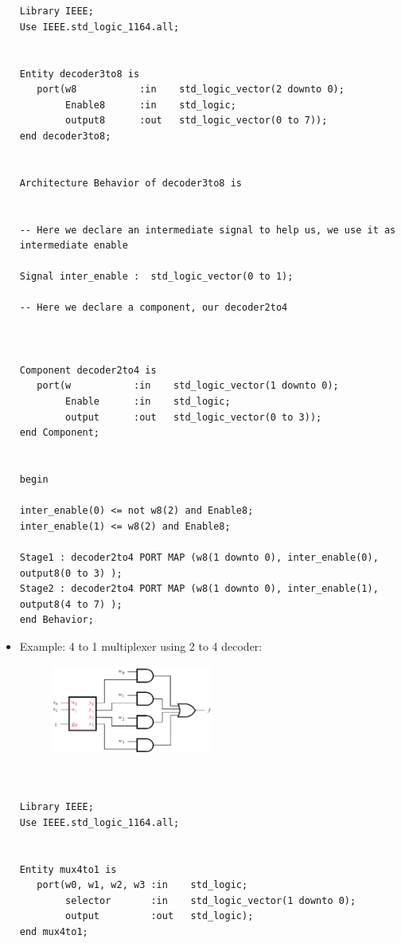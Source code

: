 \documentclass[a4paper]{article}
\begin{document}
\begin{itemize}
\begin{verbatim}


Library IEEE;
Use IEEE.std_logic_1164.all;


Entity decoder3to8 is 
   port(w8           :in    std_logic_vector(2 downto 0);
        Enable8      :in    std_logic;
        output8      :out   std_logic_vector(0 to 7));
end decoder3to8;


Architecture Behavior of decoder3to8 is


-- Here we declare an intermediate signal to help us, we use it as intermediate enable

Signal inter_enable :  std_logic_vector(0 to 1);

-- Here we declare a component, our decoder2to4



Component decoder2to4 is 
   port(w           :in    std_logic_vector(1 downto 0);
        Enable      :in    std_logic;
        output      :out   std_logic_vector(0 to 3));
end Component;


begin 

inter_enable(0) <= not w8(2) and Enable8;
inter_enable(1) <= w8(2) and Enable8;

Stage1 : decoder2to4 PORT MAP (w8(1 downto 0), inter_enable(0), output8(0 to 3) );
Stage2 : decoder2to4 PORT MAP (w8(1 downto 0), inter_enable(1), output8(4 to 7) );
end Behavior;

\end{verbatim}

\item Example: 4 to 1 multiplexer using 2 to 4 decoder:


\begin{figure}[H] 
	\centering
	\includegraphics[width=0.5\textwidth]{4 to 1 multiplexer using 2 to 4 decoder}
	\label{fig:raw data}
\end{figure}


\begin{verbatim}


Library IEEE;
Use IEEE.std_logic_1164.all;


Entity mux4to1 is 
   port(w0, w1, w2, w3 :in    std_logic;
        selector       :in    std_logic_vector(1 downto 0);
        output         :out   std_logic);
end mux4to1;



\end{verbatim}
\end{itemize}
\end{document}

